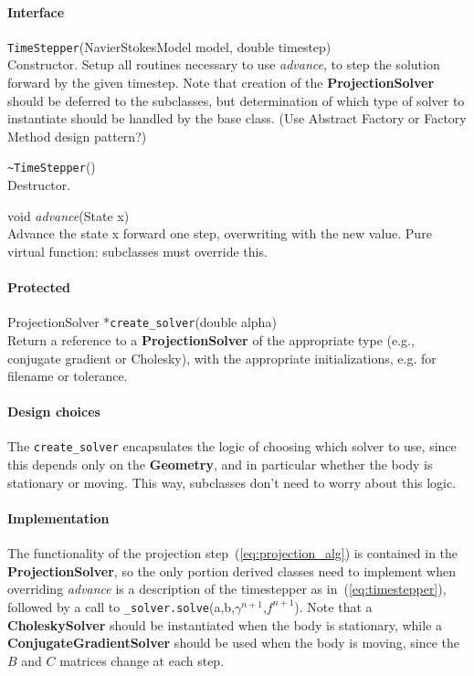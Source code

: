 \documentclass[11pt]{article}
\def\class#1{{\bf #1}} %
\def\fn#1{{\tt #1}} %
\def\virtualfn#1{{\it #1}} %
\begin{document}
\paragraph{Interface}
\begin{description}
	\item \fn{TimeStepper}(NavierStokesModel model, double timestep)\\
		Constructor.  Setup all routines necessary to use \virtualfn{advance}, to step the solution forward by the given timestep.  Note that creation of the \class{ProjectionSolver} should be deferred to the subclasses, but determination of which type of solver to instantiate should be handled by the base class.  (Use Abstract Factory or Factory Method design pattern?)
	\item \fn{\~\null TimeStepper}()\\
		Destructor.
	\item void \virtualfn{advance}(State x)\\
	 	Advance the state x forward one step, overwriting with the new value.  Pure virtual function: subclasses must override this.
\end{description}
\paragraph{Protected}
\begin{description}
	\item ProjectionSolver *\fn{create\_solver}(double alpha)\\
		Return a reference to a \class{ProjectionSolver} of the appropriate type (e.g., conjugate gradient or Cholesky), with the appropriate initializations, e.g. for filename or tolerance.
	\end{description}

\paragraph{Design choices}
The \fn{create\_solver} encapsulates the logic of choosing which solver to use, since this depends only on the \class{Geometry}, and in particular whether the body is stationary or moving.  This way, subclasses don't need to worry about this logic.

\paragraph{Implementation}
The functionality of the projection step~(\ref{eq:projection_alg}) is contained in the \class{ProjectionSolver}, so the only portion derived classes need to implement when overriding \virtualfn{advance} is a description of the timestepper as in~(\ref{eq:timestepper}), followed by a call to \fn{\_solver.solve}(a,b,$\gamma^{n+1}$,$f^{n+1}$).  Note that a \class{CholeskySolver} should be instantiated when the body is stationary, while a \class{ConjugateGradientSolver} should be used when the body is moving, since the $B$ and $C$ matrices change at each step.
\end{document}
